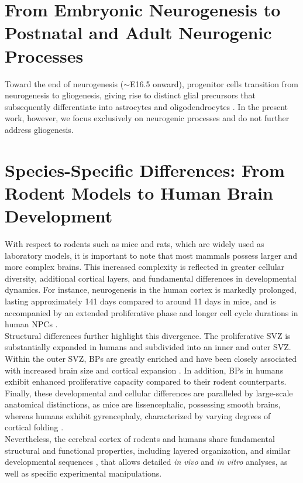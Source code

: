 \section{From Embryonic Neurogenesis to Postnatal and Adult Neurogenic Processes}
Toward the end of neurogenesis ($\sim$E16.5 onward), progenitor cells transition from neurogenesis to gliogenesis, giving rise to distinct glial precursors that subsequently differentiate into astrocytes and oligodendrocytes \citep{VIEIRANeuralStemCell2018}.
In the present work, however, we focus exclusively on neurogenic processes and do not further address gliogenesis.

\section{Species-Specific Differences: From Rodent Models to Human Brain Development}
With respect to rodents such as mice and rats, which are widely used as laboratory models, it is important to note that most mammals possess larger and more complex brains. This increased complexity is reflected in greater cellular diversity, additional cortical layers, and fundamental differences in developmental dynamics. For instance, neurogenesis in the human cortex is markedly prolonged, lasting approximately 141 days compared to around 11 days in mice, and is accompanied by an extended proliferative phase and longer cell cycle durations in human NPCs \citep{LIBE-PHILIPPOTCellularMolecularMechanisms2021}.
\\

Structural differences further highlight this divergence. The proliferative SVZ is substantially expanded in humans and subdivided into an inner and outer SVZ. Within the outer SVZ, BPs are greatly enriched and have been closely associated with increased brain size and cortical expansion \citep{reilloRoleIntermediateRadial2011}.
In addition, BPs in humans exhibit enhanced proliferative capacity compared to their rodent counterparts. Finally, these developmental and cellular differences are paralleled by large-scale anatomical distinctions, as mice are lissencephalic, possessing smooth brains, whereas humans exhibit gyrencephaly, characterized by varying degrees of cortical folding \citep{BORRELLHowCellsFold2018}.
\\

Nevertheless, the cerebral cortex of rodents and humans share fundamental structural and functional properties, including layered organization, and similar developmental sequences \citep{luhmannCanWeUnderstand2020}, that allows detailed \textit{in vivo} and \textit{in vitro} analyses, as well as specific experimental manipulations.

